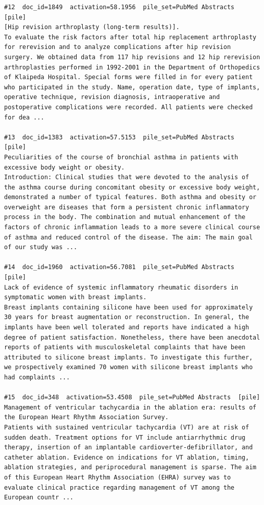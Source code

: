 \begin{verbatim}
#12  doc_id=1849  activation=58.1956  pile_set=PubMed Abstracts  [pile]
[Hip revision arthroplasty (long-term results)].
To evaluate the risk factors after total hip replacement arthroplasty for rerevision and to analyze complications after hip revision surgery. We obtained data from 117 hip revisions and 12 hip rerevision arthroplasties performed in 1992-2001 in the Department of Orthopedics of Klaipeda Hospital. Special forms were filled in for every patient who participated in the study. Name, operation date, type of implants, operative technique, revision diagnosis, intraoperative and postoperative complications were recorded. All patients were checked for dea ...

#13  doc_id=1383  activation=57.5153  pile_set=PubMed Abstracts  [pile]
Peculiarities of the course of bronchial asthma in patients with excessive body weight or obesity.
Introduction: Clinical studies that were devoted to the analysis of the asthma course during concomitant obesity or excessive body weight, demonstrated a number of typical features. Both asthma and obesity or overweight are diseases that form a persistent chronic inflammatory process in the body. The combination and mutual enhancement of the factors of chronic inflammation leads to a more severe clinical course of asthma and reduced control of the disease. The aim: The main goal of our study was ...

#14  doc_id=1960  activation=56.7081  pile_set=PubMed Abstracts  [pile]
Lack of evidence of systemic inflammatory rheumatic disorders in symptomatic women with breast implants.
Breast implants containing silicone have been used for approximately 30 years for breast augmentation or reconstruction. In general, the implants have been well tolerated and reports have indicated a high degree of patient satisfaction. Nonetheless, there have been anecdotal reports of patients with musculoskeletal complaints that have been attributed to silicone breast implants. To investigate this further, we prospectively examined 70 women with silicone breast implants who had complaints ...

#15  doc_id=348  activation=53.4508  pile_set=PubMed Abstracts  [pile]
Management of ventricular tachycardia in the ablation era: results of the European Heart Rhythm Association Survey.
Patients with sustained ventricular tachycardia (VT) are at risk of sudden death. Treatment options for VT include antiarrhythmic drug therapy, insertion of an implantable cardioverter-defibrillator, and catheter ablation. Evidence on indications for VT ablation, timing, ablation strategies, and periprocedural management is sparse. The aim of this European Heart Rhythm Association (EHRA) survey was to evaluate clinical practice regarding management of VT among the European countr ...


\end{verbatim}
